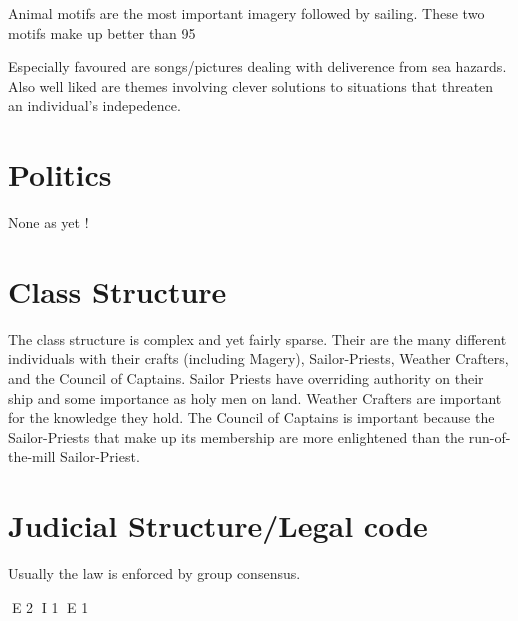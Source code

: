 Animal motifs are the most important imagery followed by sailing. 
These two motifs make up better than 95%

Especially favoured are songs/pictures dealing with deliverence 
from sea hazards. Also well liked are themes involving clever 
solutions to situations that threaten an individual's indepedence.

\section{Politics}

None as yet !

\section{Class Structure}

The class structure is complex and yet fairly sparse. Their are the many different 
individuals with their crafts (including Magery), Sailor-Priests, Weather Crafters,
and the Council of Captains. Sailor Priests have overriding authority on their ship
and some importance as holy men on land. Weather Crafters are important for the 
knowledge they hold. The Council of Captains is important because the Sailor-Priests 
that make up its membership are more enlightened than the run-of-the-mill 
Sailor-Priest.

\section{Judicial Structure/Legal code}

Usually the law is enforced by group consensus. 


E 2
I 1
E 1
